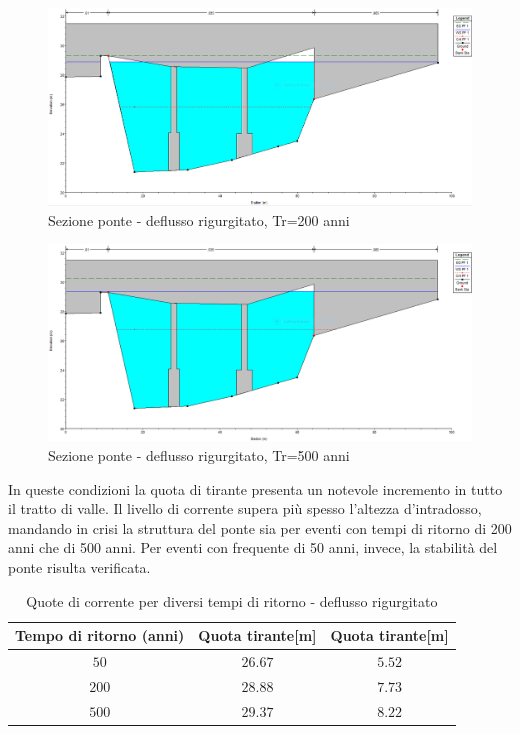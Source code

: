 \documentclass[12pt]{article} %
\begin{document}
\begin{figure}[H]
    \centering
    \includegraphics[scale=0.5]{PonteUP8.PNG}
    \caption{Sezione ponte - deflusso rigurgitato, Tr=200 anni}
\end{figure}

\begin{figure}[H]
    \centering
    \includegraphics[scale=0.5]{PonteUP82.PNG}
    \caption{Sezione ponte - deflusso rigurgitato, Tr=500 anni}
\end{figure}

\noindent In queste condizioni la quota di tirante presenta un notevole incremento in tutto il tratto di valle. Il livello di corrente supera più spesso l'altezza d'intradosso, mandando in crisi la struttura del ponte sia per eventi con tempi di ritorno di 200 anni che di 500 anni. Per eventi con frequente di 50 anni, invece, la stabilità del ponte risulta verificata.

\begin{table}[H]
    \centering
    \begin{tabular}{ccc}
        \hline
        \textbf{Tempo di ritorno (anni)} &\textbf{Quota tirante[m]}& \textbf{Quota tirante[m]} \\
        \hline
        $50$ & $26.67$ & $5.52$\\
        $200$ & $28.88$ & $7.73$\\
        $500$ & $29.37$ & $8.22$\\
        \hline
    \end{tabular}
    \caption{Quote di corrente per diversi tempi di ritorno - deflusso rigurgitato}
\end{table}
\end{document}
